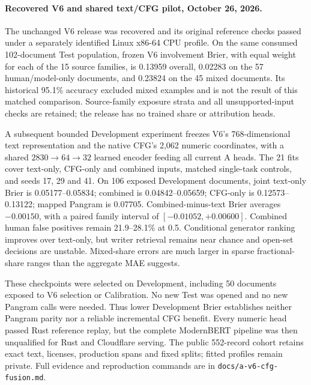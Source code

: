 \paragraph{Recovered V6 and shared text/CFG pilot, October 26, 2026.}
The unchanged V6 release was recovered and its original reference checks passed
under a separately identified Linux x86-64 CPU profile. On the same consumed
102-document Test population, frozen V6 involvement Brier, with equal weight
for each of the 15 source families, is 0.13959 overall, 0.02283 on the 57
human/model-only documents, and 0.23824 on the 45 mixed documents. Its
historical 95.1\% accuracy excluded mixed examples and is not the result of
this matched comparison. Source-family exposure strata and all
unsupported-input checks are retained; the release has no trained share or
attribution heads.

A subsequent bounded Development experiment freezes V6's 768-dimensional text
representation and the native CFG's 2,062 numeric coordinates, with a shared
$2830\!\to\!64\!\to\!32$ learned encoder feeding all current A heads. The 21
fits cover text-only, CFG-only and combined inputs, matched single-task controls,
and seeds 17, 29 and 41. On 106 exposed Development documents, joint text-only
Brier is 0.05177--0.05834; combined is 0.04842--0.05659; CFG-only is
0.12573--0.13122; mapped Pangram is 0.07705. Combined-minus-text Brier averages
$-0.00150$, with a paired family interval of $[-0.01052,+0.00600]$.
Combined human false positives remain 21.9--28.1\% at 0.5. Conditional generator
ranking improves over text-only, but writer retrieval remains near chance and
open-set decisions are unstable. Mixed-share errors are much larger in sparse
fractional-share ranges than the aggregate MAE suggests.

These checkpoints were selected on Development, including 50 documents exposed
to V6 selection or Calibration. No new Test was opened and no new Pangram calls
were needed. Thus lower Development Brier establishes neither Pangram parity
nor a reliable incremental CFG benefit. Every numeric head passed Rust reference
replay, but the complete ModernBERT pipeline was then unqualified for Rust and
Cloudflare serving. The public 552-record cohort retains exact text, licenses,
production spans and fixed splits; fitted profiles remain private. Full evidence
and reproduction commands are in \texttt{docs/a-v6-cfg-fusion.md}.

